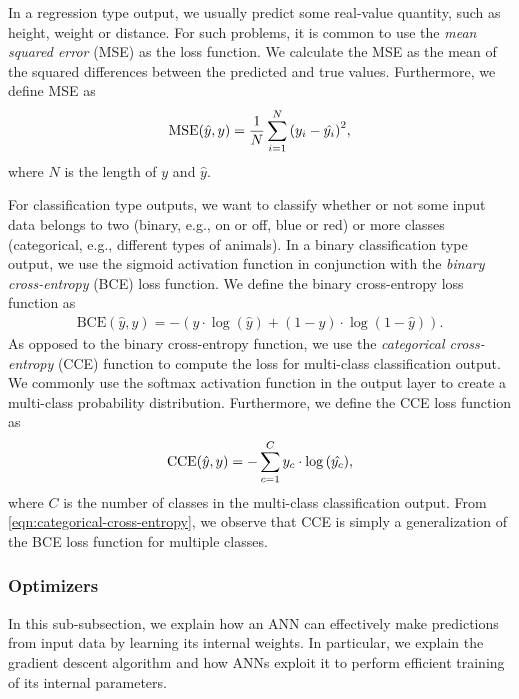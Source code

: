 In a regression type output, we usually predict some real-value quantity, such as height, weight or distance. For such problems, it is common to use the \textit{mean squared error} (MSE) as the loss function. We calculate the MSE as the mean of the squared differences between the predicted and true values. Furthermore, we define MSE as
\begin{align}
    \label{eqn:mean-squared-error}
    \text{MSE}(\hat{y}, y) = \frac{1}{N} \sum\limits_{i=1}^{N} {\left( y_i - \hat{y_i} \right)}^2,
\end{align}
where $N$ is the length of $y$ and $\hat{y}$.

For classification type outputs, we want to classify whether or not some input data belongs to two (binary, e.g., on or off, blue or red) or more classes (categorical, e.g., different types of animals). In a binary classification type output, we use the sigmoid activation function in conjunction with the \textit{binary cross-entropy} (BCE) loss function. We define the binary cross-entropy loss function as
\begin{align}
    \label{eqn:binary-cross-entropy}
    \text{BCE}(\hat{y}, y) = -\left( y \cdot \log{\left( \hat{y} \right)} + (1 - y) \cdot \log{\left( 1 - \hat{y} \right)} \right).
\end{align}
As opposed to the binary cross-entropy function, we use the \textit{categorical cross-entropy} (CCE) function to compute the loss for multi-class classification output. We commonly use the softmax activation function in the output layer to create a multi-class probability distribution. Furthermore, we define the CCE loss function as
\begin{align}
    \label{eqn:categorical-cross-entropy}
    \text{CCE}(\hat{y}, y) = -\sum\limits_{c=1}^{C} y_c \cdot \log{\left( \hat{y_c} \right)},
\end{align}
where $C$ is the number of classes in the multi-class classification output. From \cref{eqn:categorical-cross-entropy}, we observe that CCE is simply a generalization of the BCE loss function for multiple classes.

\subsubsection{Optimizers}
\label{sec:ann-optimizers}
In this sub-subsection, we explain how an ANN can effectively make predictions from input data by learning its internal weights. In particular, we explain the gradient descent algorithm and how ANNs exploit it to perform efficient training of its internal parameters.

